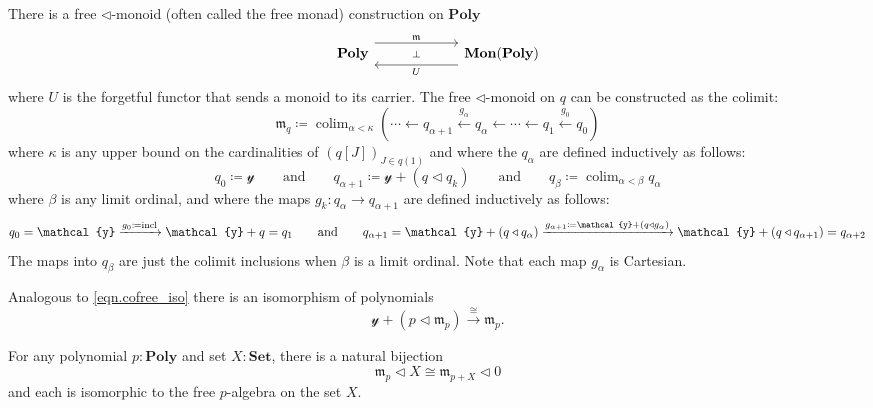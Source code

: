 \documentclass[11pt, one side, article]{memoir}
\theoremstyle{definition}
\theoremstyle{plain}
\DeclareMathOperator*{\colim}{colim}
\newcommand{\Cat}[1]{\mathbf{#1}}%
\newcommand{\Fun}[1]{\mathit{#1}}%
\newcommand{\To}[2][]{\xrightarrow[#1]{#2}}
\newcommand{\from}{\leftarrow}
\newcommand{\From}[1]{\xleftarrow{#1}}
\newcommand{\tn}[1]{\textnormal{#1}}
\newcommand{\smset}{\Cat{Set}}
\newcommand{\List}{\Fun{list}}
\newcommand{\yon}{\mathcal{y}}
\newcommand{\poly}{\Cat{Poly}}
\newcommand{\0}{\textsf{0}}
\newcommand{\1}{\tn{\textsf{1}}}
\newcommand{\tri}{\mathbin{\triangleleft}}
\newcommand{\cofree}{\mathfrak{c}}
\newcommand{\free}{\mathfrak{m}}
\newcommand{\uu}{\List}
\newcommand{\qqand}{\qquad\text{and}\qquad}
\begin{document}

There is a free $\tri$-monoid (often called the free monad) construction on $\poly$
\begin{equation}\label{eqn.free_monad}
\begin{tikzcd}[column sep=60pt]
	\poly
  	\ar[from=r, shift left=8pt, "U"]
		\ar[from=r, phantom, "\scriptstyle\bot"]
  	&
	\Cat{Mon}(\poly)
		\ar[from=l, shift right=-8pt, "\free"]
\end{tikzcd}
\end{equation}
where $U$ is the forgetful functor that sends a monoid to its carrier. 
The free $\tri$-monoid on $q$ can be constructed as the colimit:
\begin{equation}
	\free_q\coloneqq\colim_{\alpha<\kappa}(\cdots\from q_{\alpha+1}\From{g_\alpha}q_\alpha\from\cdots\from q_1\From{g_0} q_0)
\end{equation}
where $\kappa$ is any upper bound on the cardinalities of $(q[J])_{J\in q(1)}$ and where the $q_\alpha$ are defined inductively as follows:
\begin{equation}
	q_0\coloneqq \yon
	\qqand
	q_{\alpha+1}\coloneqq \yon+(q\tri q_k)
	\qqand
	q_\beta\coloneqq\colim_{\alpha<\beta}q_\alpha
\end{equation}
where $\beta$ is any limit ordinal, and where the maps $g_k\colon q_{\alpha}\to q_{\alpha+1}$ are defined inductively as follows:
\begin{equation}
	q_0=\yon
	\To{g_0\coloneqq\tn{incl}}\yon+q=q_1
	\qqand
	q_{\alpha+1}=\yon+(q\tri q_{\alpha})
	\To{g_{\alpha+1}\coloneqq\yon+(q\tri g_\alpha)}\yon+(q\tri q_{\alpha+1})=q_{\alpha+2}
\end{equation}
The maps into $q_\beta$ are just the colimit inclusions when $\beta$ is a limit ordinal. Note that each map $g_\alpha$ is Cartesian. 

Analogous to \cref{eqn.cofree_iso} there is an isomorphism of polynomials
\begin{equation}
	 \yon+(p\tri\free_p)\To{\cong}\free_p.
	\end{equation}


For any polynomial $p:\poly$ and set $X:\smset$, there is a natural bijection
\begin{equation}
  \free_p\tri X
  \cong
	\free_{p+X}\tri 0  
\end{equation}
and each is isomorphic to the free $p$-algebra on the set $X$.
\end{document}
